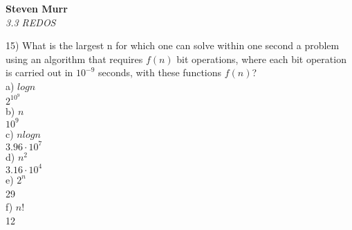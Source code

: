 \documentclass{article}
\begin{document}
\setcounter{totalnumber}{5}
   \begin{flushright}
      \Large\textbf{Steven Murr}\\
      \large\textit{3.3 REDOS}
   \end{flushright}
\begin{flushleft}
\makeatletter%
\setlength{\@fptop}{5pt}
\makeatother
\setlength\parindent{0pt}15) What is the largest n for which one can solve within one second a problem using an algorithm that requires $f(n)$ bit operations, where each bit operation is carried out in $10^{-9}$ seconds, with these functions $f(n)$? \\
\setlength\parindent{24pt}a) $log n$ \\
\setlength\parindent{48pt} $2^{10^9}$ \\
\setlength\parindent{24pt}b) $n$ \\
\setlength\parindent{48pt} $10^9$ \\
\setlength\parindent{24pt}c) $n log n$ \\
\setlength\parindent{48pt} $3.96 \cdot 10^7$ \\
\setlength\parindent{24pt}d) $n^2$ \\
\setlength\parindent{48pt} $3.16 \cdot 10^4$ \\
\setlength\parindent{24pt}e) $2^n$ \\
\setlength\parindent{48pt} 29 \\
\setlength\parindent{24pt}f) $n!$ \\
\setlength\parindent{48pt} 12
\end{flushleft}
\end{document}
